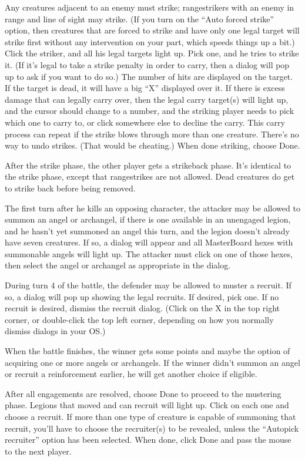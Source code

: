 \documentclass{article}
\begin{document}
Any creatures adjacent to an enemy must strike; rangestrikers with an enemy in
range and line of sight may strike. (If you turn on the ``Auto forced strike''
option, then creatures that are forced to strike and have only one legal
target will strike first without any intervention on your part, which speeds
things up a bit.) Click the striker, and all his legal targets light up. 
Pick one, and he tries to strike it. (If it's legal to take a strike penalty 
in order to carry, then a dialog will pop up to ask if you want to do so.) 
The number of hits are displayed on the target. If the target is dead, it 
will have a big ``X'' displayed over it. If there is excess damage that can 
legally carry over, then the legal carry target(s) will light up, and the
cursor should change to a number, and the striking player needs to pick 
which one to carry to, or click somewhere else to decline the carry. This 
carry process can repeat if the strike blows through more than one creature. 
There's no way to undo strikes. (That would be cheating.) When done 
striking, choose Done. 

After the strike phase, the other player gets a strikeback phase. It's
identical to the strike phase, except that rangestrikes are not allowed.
Dead creatures do get to strike back before being removed.

The first turn after he kills an opposing character, the attacker may be
allowed to summon an angel or archangel, if there is one available in an
unengaged legion, and he hasn't yet summoned an angel this turn, and the
legion doesn't already have seven creatures. If so, a dialog will appear
and all MasterBoard hexes with summonable angels will light up. The
attacker must click on one of those hexes, then select the angel or
archangel as appropriate in the dialog.

During turn 4 of the battle, the defender may be allowed to muster a recruit.
If so, a dialog will pop up showing the legal recruits. If desired, pick one.
If no recruit is desired, dismiss the recruit dialog. (Click on the X in the
top right corner, or double-click the top left corner, depending on how you
normally dismiss dialogs in your OS.)

When the battle finishes, the winner gets some points and maybe the option of
acquiring one or more angels or archangels. If the winner didn't summon
an angel or recruit a reinforcement earlier, he will get another choice if
eligible.

After all engagements are resolved, choose Done to proceed to the mustering 
phase. Legions that moved and can recruit will light up. Click on each one 
and choose a recruit. If more than one type of creature is capable of 
summoning that recruit, you'll have to choose the recruiter(s) to be 
revealed, unless the ``Autopick recruiter'' option has been selected.
When done, click Done and pass the mouse to the next player.
\end{document}
